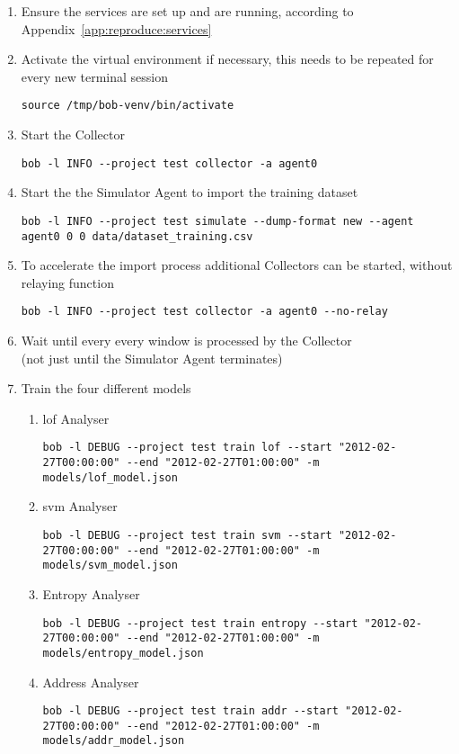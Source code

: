 \begin{enumerate}
	\item Ensure the services are set up and are running, according to Appendix~\ref{app:reproduce:services}
	\item Activate the virtual environment if necessary, this needs to be repeated for every new terminal session
\begin{lstlisting}
source /tmp/bob-venv/bin/activate
\end{lstlisting}
	\item Start the Collector
\begin{lstlisting}
bob -l INFO --project test collector -a agent0
\end{lstlisting}
	\item Start the the Simulator Agent to import the training dataset
\begin{lstlisting}
bob -l INFO --project test simulate --dump-format new --agent agent0 0 0 data/dataset_training.csv
\end{lstlisting}
	\item To accelerate the import process additional Collectors can be started, without relaying function
\begin{lstlisting}
bob -l INFO --project test collector -a agent0 --no-relay
\end{lstlisting}
	\item Wait until every every window is processed by the Collector\\ (not just until the Simulator Agent terminates)
	\item Train the four different models
		\begin{enumerate}
			\item \gls{lof} Analyser
\begin{lstlisting}
bob -l DEBUG --project test train lof --start "2012-02-27T00:00:00" --end "2012-02-27T01:00:00" -m models/lof_model.json
\end{lstlisting}
			\item \gls{svm} Analyser
\begin{lstlisting}
bob -l DEBUG --project test train svm --start "2012-02-27T00:00:00" --end "2012-02-27T01:00:00" -m models/svm_model.json
\end{lstlisting}
			\item Entropy Analyser
\begin{lstlisting}
bob -l DEBUG --project test train entropy --start "2012-02-27T00:00:00" --end "2012-02-27T01:00:00" -m models/entropy_model.json
\end{lstlisting}
			\item Address Analyser
\begin{lstlisting}
bob -l DEBUG --project test train addr --start "2012-02-27T00:00:00" --end "2012-02-27T01:00:00" -m models/addr_model.json
\end{lstlisting}
		\end{enumerate}
\end{enumerate}

